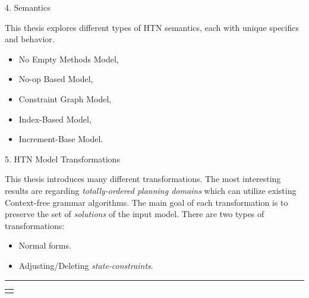 \documentclass[portrait,a0paper,fontscale=0.25]{baposter}
\renewcommand{\arraystretch}{1.5}
\begin{document}
\begin{poster}
%
%
%

\begin{posterbox}[column=0, name=semantics, below=motivation]{4. Semantics}

This thesis explores different types of HTN semantics, each with unique specifics and behavior.

\begin{itemize}
    \item No Empty Methods Model,
    \item No-op Based Model,
    \item Constraint Graph Model,
    \item Index-Based Model,
    \item Increment-Base Model.
\end{itemize}

\end{posterbox}

\begin{posterbox}[column=1, name=trans]{5. HTN Model Transformations}

This thesis introduces many different transformations. The most interesting results are regarding \emph{totally-ordered planning domains} which can utilize existing Context-free grammar algorithms. The main goal of each transformation is to preserve the set of \emph{solutions} of the input model. There are two types of transformations:

\begin{itemize}
    \item Normal forms.
    \item Adjusting/Deleting \emph{state-constraints}.
\end{itemize}

\rule{\linewidth}{0.4pt}

\renewcommand{\arraystretch}{0.1}
\begin{tabular}{p{0.95\linewidth}}
\begin{center}
\begin{tikzpicture}
    \tikzset{emptydot/.style={fill=white,circle}}
    \tikzset{base/.style = {rectangle, rounded corners, draw=black,
                           minimum width=1.5cm, minimum height=0.5cm,
                           text centered, font=\sffamily\tiny}}
    \tikzset{action/.style = {base, fill=blue!30}}
    \tikzset{abstract/.style = {base, fill=orange!15}}


\end{tikzpicture}
\end{center}
\end{tabular}
\end{posterbox}
\end{poster}
\end{document}
